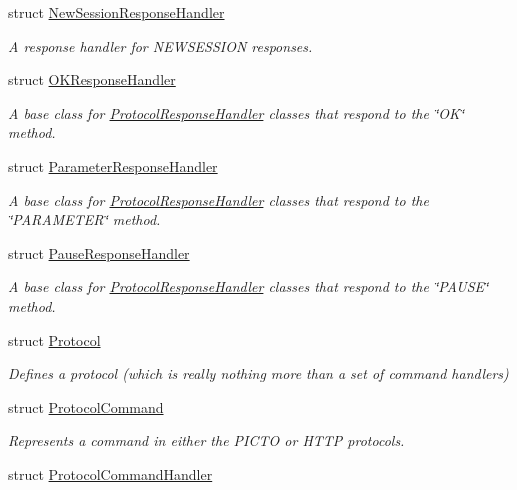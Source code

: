 \begin{DoxyCompactItemize}
struct \hyperlink{struct_picto_1_1_new_session_response_handler}{New\-Session\-Response\-Handler}
\begin{DoxyCompactList}\small\item\em A response handler for N\-E\-W\-S\-E\-S\-S\-I\-O\-N responses. \end{DoxyCompactList}\item 
struct \hyperlink{struct_picto_1_1_o_k_response_handler}{O\-K\-Response\-Handler}
\begin{DoxyCompactList}\small\item\em A base class for \hyperlink{struct_picto_1_1_protocol_response_handler}{Protocol\-Response\-Handler} classes that respond to the \char`\"{}\-O\-K\char`\"{} method. \end{DoxyCompactList}\item 
struct \hyperlink{struct_picto_1_1_parameter_response_handler}{Parameter\-Response\-Handler}
\begin{DoxyCompactList}\small\item\em A base class for \hyperlink{struct_picto_1_1_protocol_response_handler}{Protocol\-Response\-Handler} classes that respond to the \char`\"{}\-P\-A\-R\-A\-M\-E\-T\-E\-R\char`\"{} method. \end{DoxyCompactList}\item 
struct \hyperlink{struct_picto_1_1_pause_response_handler}{Pause\-Response\-Handler}
\begin{DoxyCompactList}\small\item\em A base class for \hyperlink{struct_picto_1_1_protocol_response_handler}{Protocol\-Response\-Handler} classes that respond to the \char`\"{}\-P\-A\-U\-S\-E\char`\"{} method. \end{DoxyCompactList}\item 
struct \hyperlink{struct_picto_1_1_protocol}{Protocol}
\begin{DoxyCompactList}\small\item\em Defines a protocol (which is really nothing more than a set of command handlers) \end{DoxyCompactList}\item 
struct \hyperlink{struct_picto_1_1_protocol_command}{Protocol\-Command}
\begin{DoxyCompactList}\small\item\em Represents a command in either the P\-I\-C\-T\-O or H\-T\-T\-P protocols. \end{DoxyCompactList}\item 
struct \hyperlink{struct_picto_1_1_protocol_command_handler}{Protocol\-Command\-Handler}

\end{DoxyCompactItemize}
